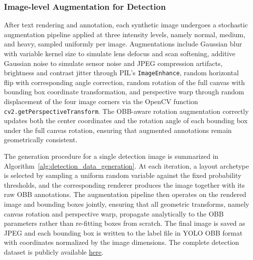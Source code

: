 \subsubsection{Image-level Augmentation for Detection}
After text rendering and annotation, each synthetic image undergoes a stochastic augmentation pipeline applied at three intensity levels, namely normal, medium, and heavy, sampled uniformly per image. Augmentations include Gaussian blur with variable kernel size to simulate lens defocus and scan softening, additive Gaussian noise to simulate sensor noise and JPEG compression artifacts, brightness and contrast jitter through PIL's \texttt{ImageEnhance}, random horizontal flip with corresponding angle correction, random rotation of the full canvas with bounding box coordinate transformation, and perspective warp through random displacement of the four image corners via the OpenCV function \texttt{cv2.getPerspectiveTransform}. The OBB-aware rotation augmentation correctly updates both the center coordinates and the rotation angle of each bounding box under the full canvas rotation, ensuring that augmented annotations remain geometrically consistent.

The generation procedure for a single detection image is summarized in Algorithm~\ref{alg:detection_data_generation}. At each iteration, a layout archetype is selected by sampling a uniform random variable against the fixed probability thresholds, and the corresponding renderer produces the image together with its raw OBB annotations. The augmentation pipeline then operates on the rendered image and bounding boxes jointly, ensuring that all geometric transforms, namely canvas rotation and perspective warp, propagate analytically to the OBB parameters rather than re-fitting boxes from scratch. The final image is saved as JPEG and each bounding box is written to the label file in YOLO OBB format with coordinates normalized by the image dimensions. The complete detection dataset is publicly available \href{https://drive.google.com/drive/folders/1Q453JEqpMgMKteGG4cbb6Nl09tVWzLd3?usp=sharing}{\underline{here}}.

